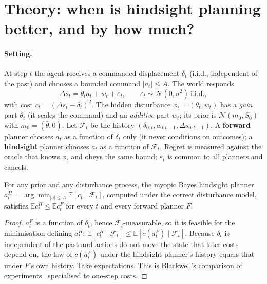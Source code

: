 \section{Theory: when is hindsight planning better, and by how much?}
\label{sec:theory}

\paragraph{Setting.} At step $t$ the agent receives a commanded displacement $\delta_t$ (i.i.d., independent of
the past) and chooses a bounded command $|a_t|\le A$. The world responds
\begin{equation}
\Delta s_t=\theta_t a_t+w_t+\varepsilon_t,\qquad \varepsilon_t\sim\mathcal N(0,\sigma^2)\ \text{i.i.d.},
\end{equation}
with cost $c_t=(\Delta s_t-\delta_t)^2$. The hidden disturbance $\phi_t=(\theta_t,w_t)$ has a \emph{gain} part
$\theta_t$ (it scales the command) and an \emph{additive} part $w_t$; its prior is $\mathcal N(m_0,S_0)$ with
$m_0=(\bar\theta,0)$. Let $\mathcal F_t$ be the history $(\delta_{0:t},a_{0:t-1},\Delta s_{0:t-1})$.
A \textbf{forward} planner chooses $a_t$ as a function of $\delta_t$ only (it never conditions on outcomes);
a \textbf{hindsight} planner chooses $a_t$ as a function of $\mathcal F_t$. Regret is measured against the
oracle that knows $\phi_t$ and obeys the same bound; $\varepsilon_t$ is common to all planners and cancels.

\begin{theorem}[Dominance]\label{thm:dominance}
For any prior and any disturbance process, the myopic Bayes hindsight planner
$a^H_t=\arg\min_{|a|\le A}\mathbb E[c_t\mid\mathcal F_t]$, computed under the correct disturbance model,
satisfies $\mathbb E c^H_t\le\mathbb E c^F_t$ for every $t$ and every forward planner $F$.
\end{theorem}
\begin{proof}
$a^F_t$ is a function of $\delta_t$, hence $\mathcal F_t$-measurable, so it is feasible for the minimisation defining
$a^H_t$: $\mathbb E[c^H_t\mid\mathcal F_t]\le\mathbb E[c(a^F_t)\mid\mathcal F_t]$. Because $\delta_t$ is
independent of the past and actions do not move the state that later costs depend on, the law of $c(a^F_t)$
under the hindsight planner's history equals that under $F$'s own history. Take expectations.
This is Blackwell's comparison of experiments~\citep{blackwell1953} specialised to one-step costs.
\end{proof}

